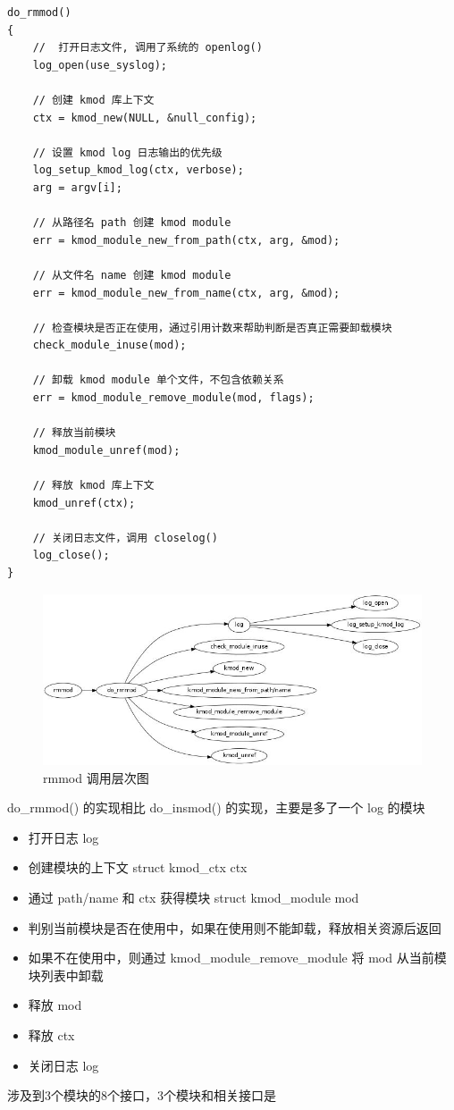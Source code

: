 \documentclass[11pt,a4paper]{article}
\makeatletter
\def\maxwidth{\ifdim\Gin@nat@width>\linewidth\linewidth
\else\Gin@nat@width\fi}
\let\Oldincludegraphics\includegraphics
\renewcommand{\includegraphics}[1]{\Oldincludegraphics[width=\maxwidth]{#1}}
\makeatother
\begin{document}
{\begin{shaded}\begin{verbatim}
do_rmmod()
{
    //  打开日志文件, 调用了系统的 openlog()
    log_open(use_syslog);

    // 创建 kmod 库上下文 
    ctx = kmod_new(NULL, &null_config);

    // 设置 kmod log 日志输出的优先级
    log_setup_kmod_log(ctx, verbose);
    arg = argv[i];

    // 从路径名 path 创建 kmod module
    err = kmod_module_new_from_path(ctx, arg, &mod);

    // 从文件名 name 创建 kmod module
    err = kmod_module_new_from_name(ctx, arg, &mod);

    // 检查模块是否正在使用，通过引用计数来帮助判断是否真正需要卸载模块
    check_module_inuse(mod);

    // 卸载 kmod module 单个文件，不包含依赖关系
    err = kmod_module_remove_module(mod, flags);

    // 释放当前模块
    kmod_module_unref(mod);

    // 释放 kmod 库上下文
    kmod_unref(ctx);

    // 关闭日志文件，调用 closelog()
    log_close();
}
\end{verbatim}\end{shaded}}
\begin{figure}[htbp]
\centering
\includegraphics{./figures/rmmod.jpg}
\caption{rmmod 调用层次图}
\end{figure}

do\_rmmod() 的实现相比 do\_insmod() 的实现，主要是多了一个 log 的模块

\begin{itemize}
\item
  打开日志 log
\item
  创建模块的上下文 struct kmod\_ctx ctx
\item
  通过 path/name 和 ctx 获得模块 struct kmod\_module mod
\item
  判别当前模块是否在使用中，如果在使用则不能卸载，释放相关资源后返回
\item
  如果不在使用中，则通过 kmod\_module\_remove\_module 将 mod
  从当前模块列表中卸载
\item
  释放 mod
\item
  释放 ctx
\item
  关闭日志 log
\end{itemize}
涉及到3个模块的8个接口，3个模块和相关接口是
\end{document}
